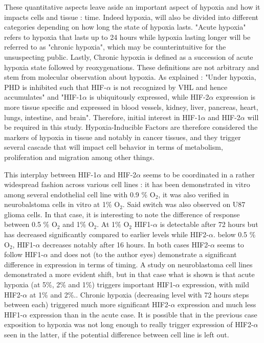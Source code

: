 \documentclass[11pt,a4paper]{article}
\begin{document}
These quantitative aspects leave aside an important aspect of hypoxia and how it impacts cells and tissue : time. Indeed hypoxia, will also be divided into different categories depending on how long the state of hypoxia lasts. "Acute hypoxia" refers to hypoxia that lasts up to 24 hours while hypoxia lasting longer will be referred to as "chronic hypoxia", which may be counterintuitive for the unsuspecting public. Lastly, Chronic hypoxia is defined as a succession of acute hypoxia state followed by reoxygenations. These definitions are not arbitrary and stem from molecular observation about hypoxia. As explained : "Under hypoxia, PHD is inhibited such that HIF-$\alpha$ is not recognized by VHL and hence accumulates"\cite{Saxena2019} and "HIF-1$\alpha$ is ubiquitously expressed, while HIF-2$\alpha$ expression is more tissue specific and expressed in blood vessels, kidney, liver, pancreas, heart, lungs, intestine, and brain". Therefore, initial interest in HIF-1$\alpha$ and HIF-2$\alpha$ will be required in this study. Hypoxia-Inducible Factors are therefore considered the markers of hypoxia in tissue and notably in cancer tissues, and they trigger several cascade that will impact cell behavior in terms of metabolism, proliferation and migration among other things.

This interplay between HIF-1$\alpha$ and HIF-2$\alpha$ seems to be coordinated in a rather widespread fashion across various cell lines : it has been demonstrated in vitro among several endothelial cell line with 0.9 \% O$_2$\cite{Bartoszewski2019},  it was also verified in neurobalstoma cells in vitro at 1\% O$_2$.\cite{Holmquist2006} Said switch was also observed on U87 glioma cells.\cite{Koh2011} In that case, it is interesting to note the difference of response between 0.5 \% O$_2$ and 1\% O$_2$. At 1\% O$_2$ HIF1-$\alpha$ is detectable after 72 hours but has decreased significantly compared to earlier levels while HIF2-$\alpha$. below 0.5 \% O$_2$, HIF1-$\alpha$ decreases notably after 16 hours. In both cases HIF2-$\alpha$ seems to follow HIF1-$\alpha$ and does not (to the author eyes) demonstrate a significant difference in expression in terms of timing. A study on neuroblastoma cell lines demonstrated a more evident shift, but in that case what is shown is that acute hypoxia (at 5\%, 2\% and 1\%) triggers important HIF1-$\alpha$ expression, with mild HIF2-$\alpha$ at 1\% and 2\%.\cite{Lin2011}. Chronic hypoxia (decreasing level with 72 hours steps between each) triggered much more significant HIF2-$\alpha$ expression and much less HIF1-$\alpha$ expression than in the acute case.\cite{Lin2011} It is possible that in the previous case exposition to hypoxia was not long enough to really trigger expression of HIF2-$\alpha$ seen in the latter, if the potential difference between cell line is left out.
\end{document}

